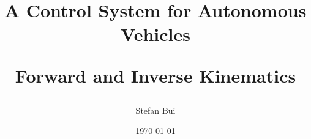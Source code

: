 \newcommand{\mytitle}{\textbf{A Control System for Autonomous Vehicles}\par
Forward and Inverse Kinematics}
\newcommand{\myauthor}{Stefan Bui}
\newcommand{\mysupervisor}{Sven Fjeldass}

\title{\mytitle}
\author{\myauthor}
\date{\today}

\newcommand*{\captionsource}[1]{
    \fontsize{7}{6}\selectfont{
        \hspace{\linewidth}
        \textbf{Source:} #1
    }
}

\AtBeginDocument{%
  \setlength{\glsdescwidth}{0.8\columnwidth}%
  \setlength{\glspagelistwidth}{.1\columnwidth}%
}

{
    \renewcommand*{\glossaryheader}{}%
    \renewcommand{\glossentry}[2]{%
        \textbf{\glsentryitem{##1}\glstarget{##1}{\glossentryname{##1}}}
        & \glossentrydesc{##1}
        & ##2
        \tabularnewline}%
}